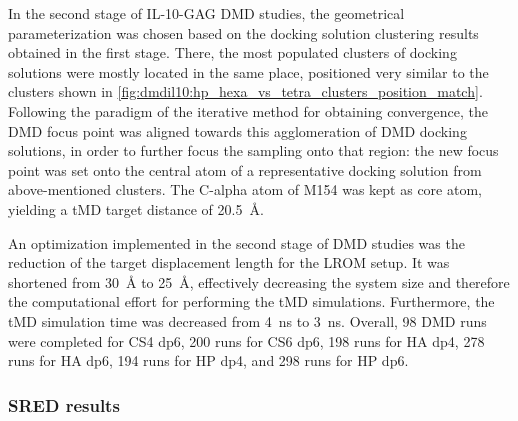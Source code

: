 In the second stage of IL-10-GAG DMD studies, the geometrical parameterization
was chosen based on the docking solution clustering results obtained in the
first stage. There, the most populated clusters of docking solutions were mostly
located in the same place, positioned very similar to the clusters shown in
\cref{fig:dmdil10:hp_hexa_vs_tetra_clusters_position_match}.  Following the
paradigm of the iterative method for obtaining convergence, the DMD focus point
was aligned towards this agglomeration of DMD docking solutions, in order to
further focus the sampling onto that region: the new focus point was set onto
the central atom of a representative docking solution from above-mentioned
clusters. The C-alpha atom of M154 was kept as core atom, yielding a tMD target
distance of \SI{20.5}{\angstrom}.

An optimization implemented in the second stage of DMD studies was the reduction
of the target displacement length for the LROM setup. It was shortened from
\SI{30}{\angstrom} to \SI{25}{\angstrom}, effectively decreasing the system size
and therefore the computational effort for performing the tMD simulations.
Furthermore, the tMD simulation time was decreased from \SI{4}{\nano\second} to
\SI{3}{\nano\second}. Overall, 98 DMD runs were completed for CS4 dp6, 200 runs
for CS6 dp6, 198 runs for HA dp4, 278 runs for HA dp6, 194 runs for HP dp4, and
298 runs for HP dp6.


\subsubsection{SRED results}


